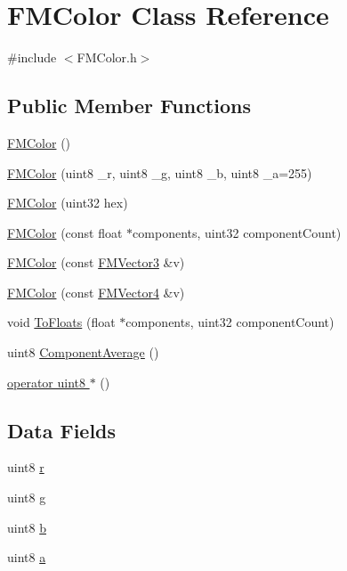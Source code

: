 \hypertarget{classFMColor}{
\section{FMColor Class Reference}
\label{classFMColor}
}


{\ttfamily \#include $<$FMColor.h$>$}

\subsection*{Public Member Functions}
\begin{DoxyCompactItemize}
\item 
\hyperlink{classFMColor_a9acb710671c50f603c90e06ec2ed86b8}{FMColor} ()
\item 
\hyperlink{classFMColor_aee3407cc1b6df36919c3199e428bcb36}{FMColor} (uint8 \_\-r, uint8 \_\-g, uint8 \_\-b, uint8 \_\-a=255)
\item 
\hyperlink{classFMColor_aed846f140eef6e7379d2a4d7e11e0ce3}{FMColor} (uint32 hex)
\item 
\hyperlink{classFMColor_ae3df0928bc78ec430804397fd47e8df5}{FMColor} (const float $\ast$components, uint32 componentCount)
\item 
\hyperlink{classFMColor_a07b3d5e6216562e8ebf74a945a258dec}{FMColor} (const \hyperlink{classFMVector3}{FMVector3} \&v)
\item 
\hyperlink{classFMColor_a47217e9d9c89a93123e44a7e080a74b8}{FMColor} (const \hyperlink{classFMVector4}{FMVector4} \&v)
\item 
void \hyperlink{classFMColor_a89dcfa30dd18ff55c4aa79504fcabf24}{ToFloats} (float $\ast$components, uint32 componentCount)
\item 
uint8 \hyperlink{classFMColor_a911f0f47225a8c9c89246dd01280f789}{ComponentAverage} ()
\item 
\hyperlink{classFMColor_a4cbe7fa247d38162d700fabe70240b0a}{operator uint8 $\ast$} ()
\end{DoxyCompactItemize}
\subsection*{Data Fields}
\begin{DoxyCompactItemize}
\item 
uint8 \hyperlink{classFMColor_a36789d346608eb0c778d58204ea1f406}{r}
\item 
uint8 \hyperlink{classFMColor_a0868b26c7d46f6fd5fb753e63010c377}{g}
\item 
uint8 \hyperlink{classFMColor_aba4a975fc1d71d6f0065cf67f90d3c45}{b}
\item 
uint8 \hyperlink{classFMColor_a42355f56b082b874c5580a9b4625be7c}{a}
\end{DoxyCompactItemize}


